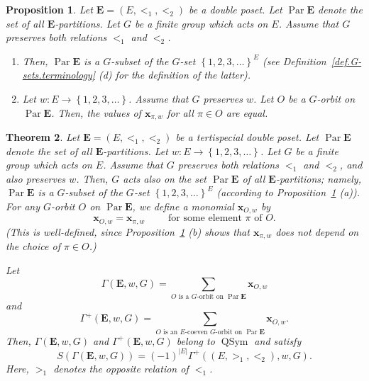 \documentclass[12pt]{article}
\theoremstyle{plain}
\newtheorem{theorem}{Theorem}
\newtheorem{proposition}[theorem]{Proposition}
\theoremstyle{definition}
\theoremstyle{remark}
\let\sumnonlimits\sum
\renewcommand{\sum}{\sumnonlimits\limits}
\newcommand{\xx}{{\mathbf{x}}}
\newcommand{\QSym}{{\operatorname{QSym}}}
\newcommand{\Par}{\operatorname{Par}}
\newcommand{\EE}{{\mathbf{E}}}
\begin{document}
\begin{proposition}
\label{prop.xxOw}
Let $\EE = \left(E, <_1, <_2\right)$ be a double poset.
Let $\Par \EE$ denote the set of all $\EE$-partitions.
Let $G$ be a finite
group which acts on $E$. Assume that $G$ preserves both
relations $<_1$ and $<_2$.

\begin{enumerate}

\item[(a)]
Then, $\Par \EE$ is a $G$-subset of the $G$-set
$\left\{1, 2, 3, \ldots\right\}^E$ (see
Definition~\ref{def.G-sets.terminology} (d) for the definition of
the latter).

\item[(b)] Let $w : E \to \left\{1, 2, 3, \ldots\right\}$. Assume that
$G$ preserves $w$.
Let $O$ be a $G$-orbit on $\Par \EE$. Then, the values of $\xx_{\pi, w}$
for all $\pi \in O$ are equal.

\end{enumerate}

\end{proposition}

\begin{theorem}
\label{thm.antipode.GammawG}
Let $\EE = \left(E, <_1, <_2\right)$ be a tertispecial double poset.
Let $\Par \EE$ denote the set of all $\EE$-partitions.
Let $w : E \to \left\{1, 2, 3, \ldots\right\}$. Let $G$ be a finite
group which acts on $E$. Assume that $G$ preserves both
relations $<_1$ and $<_2$, and also preserves $w$.
Then, $G$ acts also on the set $\Par \EE$ of all
$\EE$-partitions; namely, $\Par \EE$ is a $G$-subset of the $G$-set
$\left\{1, 2, 3, \ldots\right\}^E$ (according to
Proposition~\ref{prop.xxOw} (a)).
For any $G$-orbit $O$ on $\Par \EE$, we define a monomial $\xx_{O, w}$
by
\[ \xx_{O, w} = \xx_{\pi, w} \qquad \text{ for some element }
\pi \text{ of } O .
\]
(This is well-defined, since Proposition~\ref{prop.xxOw} (b) shows
that $\xx_{\pi, w}$ does not depend on the choice of $\pi \in O$.)

Let
\[
\Gamma\left(\EE, w, G\right) = \sum_{O\text{ is a }
G\text{-orbit on } \Par \EE} \xx_{O, w}
\]
and
\[
\Gamma^+\left(\EE, w, G\right) = \sum_{O\text{ is an }E\text{-coeven }
G\text{-orbit on } \Par \EE} \xx_{O, w} .
\]
Then, $\Gamma\left(\EE, w, G\right)$ and
$\Gamma^+\left(\EE, w, G\right)$ belong to $\QSym$ and satisfy
\[
S\left(\Gamma\left(\EE, w, G\right)\right)
= \left(-1\right)^{\left|E\right|}
\Gamma^+\left(\left(E, >_1, <_2\right), w, G\right) .
\]
Here, $>_1$ denotes the opposite relation of $<_1$.
\end{theorem}
\end{document}
